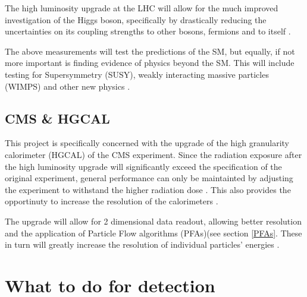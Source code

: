 \documentclass[12 pt]{article}
\begin{document}
			The high luminosity upgrade at the LHC will allow for the much improved investigation of the Higgs boson, specifically by drastically reducing the uncertainties on its coupling strengths to other bosons, fermions and to itself \cite{mot}.

			The above measurements will test the predictions of the SM, but equally, if not more important is finding evidence of physics beyond the SM. This will include testing for Supersymmetry (SUSY), weakly interacting massive particles (WIMPS) and other new physics \cite{mot}.
		\subsection{CMS \& HGCAL}
			This project is specifically concerned with the upgrade of the high granularity calorimeter (HGCAL) of the CMS experiment. Since the radiation exposure after the high luminosity upgrade will significantly exceed the specification of the original experiment, general performance can only be maintainted by adjusting the experiment to withstand the higher radiation dose \cite{TDR} \cite{mot}. This also provides the opportinuty to increase the resolution of the calorimeters \cite{PFAsInHCAL} \cite{calice}. 

			The upgrade will allow for 2 dimensional data readout, allowing better resolution and the application of Particle Flow algorithms (PFAs)(see section \ref{PFAs}. These in turn will greatly increase the resolution of individual particles' energies \cite{PFAsInHCAL}.
	\section{What to do for detection}
\end{document}

